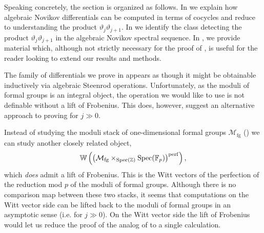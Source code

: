 

Speaking concretely, the section is organized as follows.
In  we explain how algebraic Novikov differentials can be computed in terms of cocycles and reduce  to understanding the product $\vartheta_j\vartheta_{j+1}$.
In  we identify the class detecting the product $\vartheta_j\vartheta_{j+1}$ in the algebraic Novikov spectral sequence.
In , we provide material which, although not strictly necessary for the proof of , is useful for the reader looking to extend our results and methods.


\begin{rmk}
  The family of differentials we prove in  
  appears as though it might be obtainable inductively via algebraic Steenrod operations. 
  Unfortunately, as the moduli of formal groups is an integral object, 
  the operation we would like to use is not definable without a lift of Frobenius. 
  This does, however, suggest an alternative approach to proving  for $j \gg 0$.
  
  Instead of studying the moduli stack of one-dimensional formal groups $\mathcal{M}_{\mathrm{fg}}$ (\cite{GoerssMfg, HopkinsMfg}) we can study another closely related object,
  \[ \mathbb{W}\left( \left( \mathcal{M}_{\mathrm{fg}} \times_{\operatorname{\text{Spec}}(\operatorname{\mathbb{Z}})} \operatorname{\text{Spec}}(\operatorname{\mathbb{F}}_p) \right)^{\mathrm{perf}} \right),\]
  which \emph{does} admit a lift of Frobenius.
  This is the Witt vectors of the perfection of the reduction mod $p$ of the moduli of formal groups.
  Although there is no comparison map between these two stacks, 
  it seems that computations on the Witt vector side can be lifted back to the moduli of formal groups in an asymptotic sense (i.e. for $j \gg 0$).
  On the Witt vector side the lift of Frobenius would let us reduce the proof of the analog of  to a single calculation.
\end{rmk}

